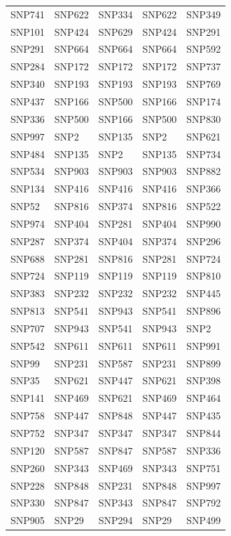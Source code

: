 \begin{table}[ht]
\begin{tabular}{lllll}
  SNP741 & SNP622 & SNP334 & SNP622 & SNP349 \\ 
  SNP101 & SNP424 & SNP629 & SNP424 & SNP291 \\ 
  SNP291 & SNP664 & SNP664 & SNP664 & SNP592 \\ 
  SNP284 & SNP172 & SNP172 & SNP172 & SNP737 \\ 
  SNP340 & SNP193 & SNP193 & SNP193 & SNP769 \\ 
  SNP437 & SNP166 & SNP500 & SNP166 & SNP174 \\ 
  SNP336 & SNP500 & SNP166 & SNP500 & SNP830 \\ 
  SNP997 & SNP2 & SNP135 & SNP2 & SNP621 \\ 
  SNP484 & SNP135 & SNP2 & SNP135 & SNP734 \\ 
  SNP534 & SNP903 & SNP903 & SNP903 & SNP882 \\ 
  SNP134 & SNP416 & SNP416 & SNP416 & SNP366 \\ 
  SNP52 & SNP816 & SNP374 & SNP816 & SNP522 \\ 
  SNP974 & SNP404 & SNP281 & SNP404 & SNP990 \\ 
  SNP287 & SNP374 & SNP404 & SNP374 & SNP296 \\ 
  SNP688 & SNP281 & SNP816 & SNP281 & SNP724 \\ 
  SNP724 & SNP119 & SNP119 & SNP119 & SNP810 \\ 
  SNP383 & SNP232 & SNP232 & SNP232 & SNP445 \\ 
  SNP813 & SNP541 & SNP943 & SNP541 & SNP896 \\ 
  SNP707 & SNP943 & SNP541 & SNP943 & SNP2 \\ 
  SNP542 & SNP611 & SNP611 & SNP611 & SNP991 \\ 
  SNP99 & SNP231 & SNP587 & SNP231 & SNP899 \\ 
  SNP35 & SNP621 & SNP447 & SNP621 & SNP398 \\ 
  SNP141 & SNP469 & SNP621 & SNP469 & SNP464 \\ 
  SNP758 & SNP447 & SNP848 & SNP447 & SNP435 \\ 
  SNP752 & SNP347 & SNP347 & SNP347 & SNP844 \\ 
  SNP120 & SNP587 & SNP847 & SNP587 & SNP336 \\ 
  SNP260 & SNP343 & SNP469 & SNP343 & SNP751 \\ 
  SNP228 & SNP848 & SNP231 & SNP848 & SNP997 \\ 
  SNP330 & SNP847 & SNP343 & SNP847 & SNP792 \\ 
  SNP905 & SNP29 & SNP294 & SNP29 & SNP499 \\ 

\end{tabular}
\end{table}
